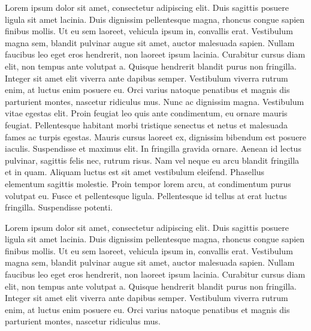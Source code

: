 \documentclass[
  letterpaper,
  toc=chapterentrywithdots,
  listof=totoc,
  11pt,
  headings=small,
  usegeometry]{scrreprt}
\begin{document}
Lorem ipsum dolor sit amet, consectetur adipiscing elit. Duis sagittis
posuere ligula sit amet lacinia. Duis dignissim pellentesque magna,
rhoncus congue sapien finibus mollis. Ut eu sem laoreet, vehicula ipsum
in, convallis erat. Vestibulum magna sem, blandit pulvinar augue sit
amet, auctor malesuada sapien. Nullam faucibus leo eget eros hendrerit,
non laoreet ipsum lacinia. Curabitur cursus diam elit, non tempus ante
volutpat a. Quisque hendrerit blandit purus non fringilla. Integer sit
amet elit viverra ante dapibus semper. Vestibulum viverra rutrum enim,
at luctus enim posuere eu. Orci varius natoque penatibus et magnis dis
parturient montes, nascetur ridiculus mus. Nunc ac dignissim magna.
Vestibulum vitae egestas elit. Proin feugiat leo quis ante condimentum,
eu ornare mauris feugiat. Pellentesque habitant morbi tristique senectus
et netus et malesuada fames ac turpis egestas. Mauris cursus laoreet ex,
dignissim bibendum est posuere iaculis. Suspendisse et maximus elit. In
fringilla gravida ornare. Aenean id lectus pulvinar, sagittis felis nec,
rutrum risus. Nam vel neque eu arcu blandit fringilla et in quam.
Aliquam luctus est sit amet vestibulum eleifend. Phasellus elementum
sagittis molestie. Proin tempor lorem arcu, at condimentum purus
volutpat eu. Fusce et pellentesque ligula. Pellentesque id tellus at
erat luctus fringilla. Suspendisse potenti. 

    \clearpage
    \areaset[current]{9in}{5.5in}
    \setlength{\oddsidemargin}{0in}
    \setlength{\evensidemargin}{0in}
    \setlength{\topmargin}{-0.5in}
    \setlength{\headheight}{30pt}
    \setlength{\headsep}{25pt}
    \setlength{\footskip}{1in}
    \pagestyle{scrheadings}



    \clearpage
    \savedportrait
    \pagestyle{scrheadings}

Lorem ipsum dolor sit amet, consectetur adipiscing elit. Duis sagittis
posuere ligula sit amet lacinia. Duis dignissim pellentesque magna,
rhoncus congue sapien finibus mollis. Ut eu sem laoreet, vehicula ipsum
in, convallis erat. Vestibulum magna sem, blandit pulvinar augue sit
amet, auctor malesuada sapien. Nullam faucibus leo eget eros hendrerit,
non laoreet ipsum lacinia. Curabitur cursus diam elit, non tempus ante
volutpat a. Quisque hendrerit blandit purus non fringilla. Integer sit
amet elit viverra ante dapibus semper. Vestibulum viverra rutrum enim,
at luctus enim posuere eu. Orci varius natoque penatibus et magnis dis
parturient montes, nascetur ridiculus mus.
\end{document}

